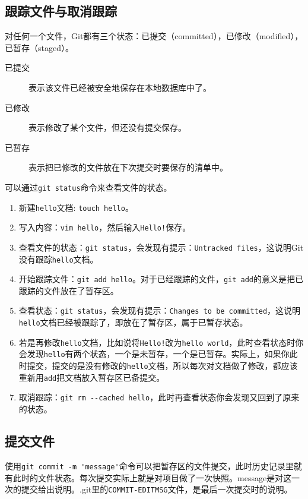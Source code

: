 \documentclass[a4paper,12pt]{article}
\begin{document}
\subsection{跟踪文件与取消跟踪}

对任何一个文件，Git都有三个状态：已提交（committed），已修改（modified），已暂存（staged）。
\begin{description}
\item[已提交] 表示该文件已经被安全地保存在本地数据库中了。
\item[已修改] 表示修改了某个文件，但还没有提交保存。
\item[已暂存] 表示把已修改的文件放在下次提交时要保存的清单中。
\end{description}

可以通过\lstinline|git status|命令来查看文件的状态。

\begin{enumerate}
\item 新建\verb|hello|文档: \lstinline|touch hello|。
\item 写入内容：\lstinline|vim hello|，然后输入\verb|Hello!|保存。
\item 查看文件的状态：\lstinline|git status|，会发现有提示：\verb|Untracked files|，这说明Git没有跟踪\verb|hello|文档。
\item 开始跟踪文件：\lstinline|git add hello|。对于已经跟踪的文件，\lstinline|git add|的意义是把已跟踪的文件放在了暂存区。
\item 查看状态：\lstinline|git status|，会发现有提示：\verb|Changes to be committed|，这说明\verb|hello|文档已经被跟踪了，即放在了暂存区，属于已暂存状态。
\item 若是再修改\verb|hello|文档，比如说将\verb|Hello!|改为\verb|hello world|，此时查看状态时你会发现\verb|hello|有两个状态，一个是未暂存，一个是已暂存。实际上，如果你此时提交，提交的是没有修改的\verb|hello|文档，所以每次对文档做了修改，都应该重新用\lstinline|add|把文档放入暂存区已备提交。
\item 取消跟踪：\lstinline|git rm --cached hello|，此时再查看状态你会发现又回到了原来的状态。
\end{enumerate}

\subsection{提交文件}

使用\lstinline|git commit -m 'message'|命令可以把暂存区的文件提交，此时历史记录里就有此时的文件状态。每次提交实际上就是对项目做了一次快照。message是对这一次的提交给出说明。.git里的\verb|COMMIT-EDITMSG|文件，是最后一次提交时的说明。
\end{document}
